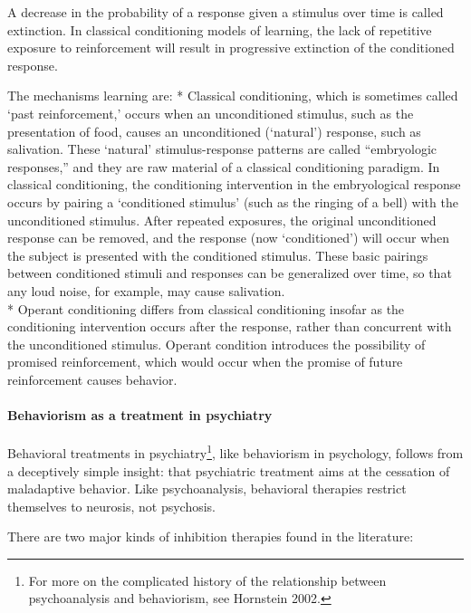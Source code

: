A decrease in the probability of a response given a stimulus over time is called extinction. In classical conditioning models of learning, the lack of repetitive exposure to reinforcement will result in progressive extinction of the conditioned response.

The mechanisms learning are:
* Classical conditioning, which is sometimes called `past reinforcement,' occurs when an unconditioned stimulus, such as the presentation of food, causes an unconditioned (`natural') response, such as salivation. These `natural' stimulus-response patterns are called “embryologic responses,” and they are raw material of a classical conditioning paradigm. In classical conditioning, the conditioning intervention in the embryological response occurs by pairing a `conditioned stimulus' (such as the ringing of a bell) with the unconditioned stimulus. After repeated exposures, the original unconditioned response can be removed, and the response (now `conditioned') will occur when the subject is presented with the conditioned stimulus. These basic pairings between conditioned stimuli and responses can be generalized over time, so that any loud noise, for example, may cause salivation.\\
* Operant conditioning differs from classical conditioning insofar as the conditioning intervention occurs after the response, rather than concurrent with the unconditioned stimulus. Operant condition introduces the possibility of promised reinforcement, which would occur when the promise of future reinforcement causes behavior.

\paragraph{Behaviorism as a treatment in psychiatry}
\label{behaviorismasatreatmentinpsychiatry}

Behavioral treatments in psychiatry\footnote{For more on the complicated history of the relationship between psychoanalysis and behaviorism, see Hornstein 2002.}, like behaviorism in psychology, follows from a deceptively simple insight: that psychiatric treatment aims at the cessation of maladaptive behavior. Like psychoanalysis, behavioral therapies restrict themselves to neurosis, not psychosis.

There are two major kinds of inhibition therapies found in the literature:

